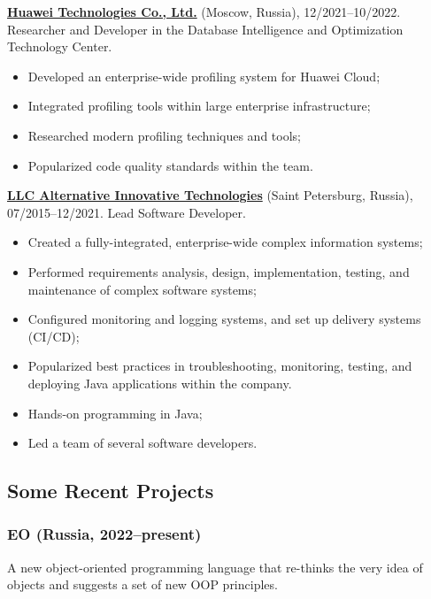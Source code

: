 \documentclass{vl}
\begin{document}
    \textbf{\href{https://www.huawei.com}{Huawei Technologies Co., Ltd.}} (Moscow, Russia), 12/2021--10/2022.\newline
    Researcher and Developer in the Database Intelligence and Optimization Technology Center.

    \begin{itemize}
        \item Developed an enterprise-wide profiling system for Huawei Cloud;
        \item Integrated profiling tools within large enterprise infrastructure;
        \item Researched modern profiling techniques and tools;
        \item Popularized code quality standards within the team.
    \end{itemize}

    \textbf{\href{https://altinntech.com/en/}{LLC Alternative Innovative Technologies}} (Saint Petersburg, Russia),
    07/2015--12/2021.
    Lead Software Developer.

    \begin{itemize}
        \item Created a fully-integrated, enterprise-wide complex information systems;
        \item Performed requirements analysis, design, implementation, testing, and maintenance of complex software
        systems;
        \item Configured monitoring and logging systems, and set up delivery systems (CI/CD);
        \item Popularized best practices in troubleshooting, monitoring, testing, and deploying Java applications
        within the company.
        \item Hands-on programming in Java;
        \item Led a team of several software developers.
    \end{itemize}

    \subsection*{Some Recent Projects}

    \subsubsection{EO (Russia, 2022--present)}

    A new object-oriented
    programming language that re-thinks the very idea of objects
    and suggests a set of new OOP principles.
\end{document}
